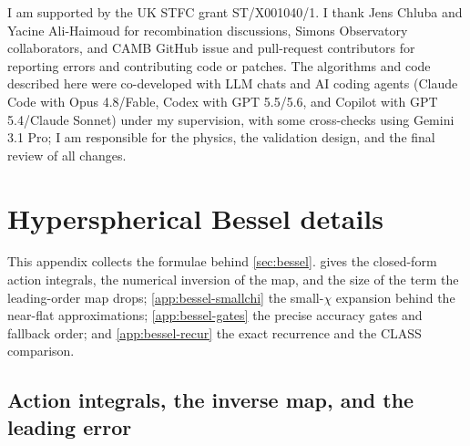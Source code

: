 \documentclass[prd, twocolumn, superscriptaddress, tightenlines, longbibliography, nofootinbib, eqsecnum, amsfonts, amsmath, floatfix, notitlepage]{revtex4-2}
\begin{document}
\begin{acknowledgments}
I am supported by the UK STFC grant ST/X001040/1. I thank Jens Chluba and
Yacine Ali-Haimoud for recombination discussions, Simons Observatory collaborators,
and CAMB GitHub issue and pull-request
contributors for reporting errors and contributing code or patches. The
algorithms and code described here were co-developed with LLM chats and AI coding
agents (Claude Code with Opus 4.8/Fable, Codex with GPT 5.5/5.6, and Copilot with GPT 5.4/Claude Sonnet) under my supervision, with some cross-checks using Gemini 3.1 Pro; I am responsible
for the physics, the validation design, and the final review of all changes.
\end{acknowledgments}

\appendix

\section{Hyperspherical Bessel details}
\label{app:bessel}

This appendix collects the formulae behind \cref{sec:bessel}.
 gives the closed-form action integrals, the numerical
inversion of the map, and the size of the term the leading-order map drops;
\cref{app:bessel-smallchi} the small-$\chi$ expansion behind the near-flat
approximations; \cref{app:bessel-gates} the precise accuracy gates and fallback
order; and \cref{app:bessel-recur} the exact recurrence and the \textsc{CLASS}
comparison.

\subsection{Action integrals, the inverse map, and the leading error}
\label{app:bessel-action}
\end{document}
